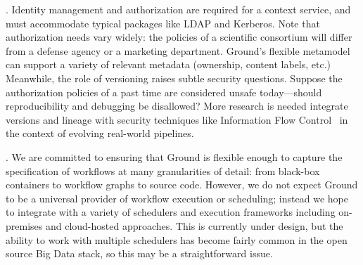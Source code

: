 \documentclass{sig-alternate}
\begin{document}
.  
Identity management and authorization are required for a context service, and must accommodate typical packages like LDAP and Kerberos.  
Note that authorization needs vary widely: the policies of a scientific consortium will differ from a defense agency or a marketing department.  
Ground's flexible metamodel can support a variety of relevant metadata (ownership, content labels, etc.) 
Meanwhile, the role of versioning raises
subtle security questions.
Suppose the authorization policies of a past time are considered unsafe today---should reproducibility and debugging be disallowed? 
More research is needed integrate
versions and lineage 
with security techniques like Information Flow Control~\cite{zeldovich2008securing} in the context of evolving real-world pipelines.


. 
We are committed to ensuring that Ground is flexible enough to capture the specification of workflows at many granularities of detail: from black-box containers to workflow graphs to source code.  
However, we do not expect Ground to be a universal provider of workflow execution or scheduling; instead we hope to integrate with a variety of schedulers and execution frameworks including on-premises and cloud-hosted approaches. 
This is currently under design, but the ability to work with multiple schedulers has become fairly common in the open source Big Data stack, so this may be a straightforward issue.
\end{document}
